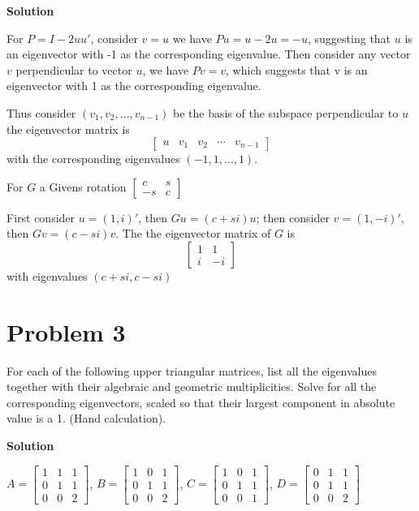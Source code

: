 \documentclass[12pt,oneside,a4paper]{article}
\newcommand{\problem}[1]
{
    \clearpage
    \section*{Problem {#1}}
}
\newcommand{\solution}
{
    \vspace{15pt}
    \noindent\ignorespaces\textbf{\large Solution}\par
}
\begin{document}
\solution
For $P = I - 2uu'$, consider $v = u$ we have $Pu = u - 2u = -u$, suggesting that $u$ is an eigenvector with -1 as the corresponding eigenvalue. Then consider any vector $v$ perpendicular to vector $u$, we have $Pv = v$, which suggests that v is an eigenvector with 1 as the corresponding eigenvalue. 

Thus consider $(v_{1}, v_{2}, \dots, v_{n-1})$ be the basis of the subspace perpendicular to $u$\\
the eigenvector matrix is 
$$\begin{bmatrix}
u & v_{1} & v_{2} & \cdots & v_{n-1}
\end{bmatrix}$$
with the corresponding eigenvalues $(-1, 1, \dots, 1)$.

For $G$ a Givens rotation 
$\begin{bmatrix}
c&s\\
-s&c
\end{bmatrix}$

First consider $u = (1, i)'$, then $Gu = (c + si)u$; then consider $v = (1, -i)'$, then $Gv = (c - si)v$. The the eigenvector matrix of $G$ is 
$$
\begin{bmatrix}
1 & 1\\
i & -i
\end{bmatrix}
$$
with eigenvalues $(c+si, c-si)$

\problem{3}
For each of the following upper triangular matrices, list all the eigenvalues together with their algebraic and geometric multiplicities. Solve for all the corresponding eigenvectors, scaled so that their largest component in absolute value is a 1. (Hand calculation).

\solution
$A = \begin{bmatrix}
1 & 1 & 1\\
0 & 1 & 1\\
0 & 0 & 2
\end{bmatrix}$, 
$B = \begin{bmatrix}
1 & 0 & 1\\
0 & 1 & 1\\
0 & 0 & 2
\end{bmatrix}$,
$C = \begin{bmatrix}
1 & 0 & 1\\
0 & 1 & 1\\
0 & 0 & 1
\end{bmatrix}$,
$D = \begin{bmatrix}
0 & 1 & 1\\
0 & 1 & 1\\
0 & 0 & 2
\end{bmatrix}$
\end{document}
